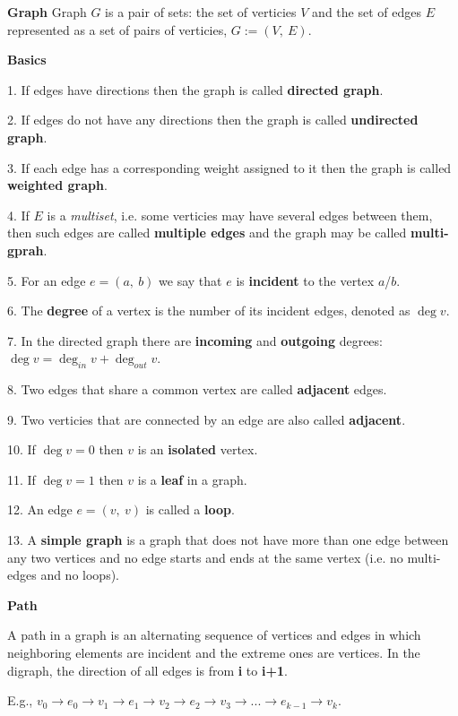 
\begin{definition}\textbf{Graph}
    Graph $G$ is a pair of sets: the set of verticies $V$ and the set of edges $E$ represented as a set of pairs of verticies, $G := (V,\ E)$.
\end{definition}

\begin{definition}\textbf{Basics}

    1. If edges have directions then the graph is called \textbf{directed graph}.

    2. If edges do not have any directions then the graph is called \textbf{undirected graph}.

    3. If each edge has a corresponding weight assigned to it then the graph is called \textbf{weighted graph}.

    4. If $E$ is a \textit{multiset}, i.e. some verticies may have several edges between them, then such edges are called \textbf{multiple edges} and the graph may be called \textbf{multi-gprah}.

    5. For an edge $e = (a,\ b)$ we say that $e$ is \textbf{incident} to the vertex $a$/$b$.

    6. The \textbf{degree} of a vertex is the number of its incident edges, denoted as $\deg{v}$.

    7. In the directed graph there are \textbf{incoming} and \textbf{outgoing} degrees: $\deg{v} = \deg_{in}{v} + \deg_{out}{v}$.

    8. Two edges that share a common vertex are called \textbf{adjacent} edges.

    9. Two verticies that are connected by an edge are also called \textbf{adjacent}.

    10. If $\deg{v} = 0$ then $v$ is an \textbf{isolated} vertex.

    11. If $\deg{v} = 1$ then $v$ is a \textbf{leaf} in a graph.

    12. An edge $e = (v,\ v)$ is called a \textbf{loop}.

    13. A \textbf{simple graph} is a graph that does not have more than one edge between any two vertices and no edge starts and ends at the same vertex (i.e. no multi-edges and no loops).

\end{definition}

\begin{definition}\textbf{Path}

    A path in a graph is an alternating sequence of vertices and edges in which neighboring elements are incident and the extreme ones are vertices. In the digraph, the direction of all edges is from \textbf{i} to \textbf{i+1}.

    E.g., $v_0 \to e_0 \to v_1 \to e_1 \to v_2 \to e_2 \to v_3 \to ... \to e_{k-1} \to v_k$.

\end{definition}

